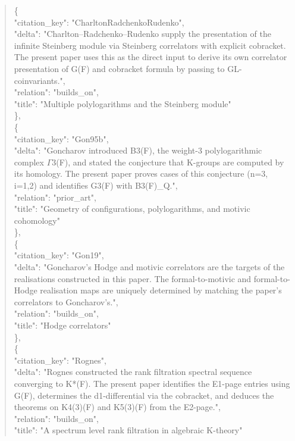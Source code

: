 \documentclass[11pt]{article}
\begin{document}
\begin{quote}
    \{\\
      "citation\_key": "CharltonRadchenkoRudenko",\\
      "delta": "Charlton--Radchenko--Rudenko supply the presentation of the infinite Steinberg module via Steinberg correlators with explicit cobracket. The present paper uses this as the direct input to derive its own correlator presentation of G(F) and cobracket formula by passing to GL-coinvariants.",\\
      "relation": "builds\_on",\\
      "title": "Multiple polylogarithms and the Steinberg module"\\
    \},\\
    \{\\
      "citation\_key": "Gon95b",\\
      "delta": "Goncharov introduced B3(F), the weight-3 polylogarithmic complex \ensuremath{\Gamma}3(F), and stated the conjecture that K-groups are computed by its homology. The present paper proves cases of this conjecture (n=3, i=1,2) and identifies G3(F) with B3(F)\_Q.",\\
      "relation": "prior\_art",\\
      "title": "Geometry of configurations, polylogarithms, and motivic cohomology"\\
    \},\\
    \{\\
      "citation\_key": "Gon19",\\
      "delta": "Goncharov's Hodge and motivic correlators are the targets of the realisations constructed in this paper. The formal-to-motivic and formal-to-Hodge realisation maps are uniquely determined by matching the paper's correlators to Goncharov's.",\\
      "relation": "builds\_on",\\
      "title": "Hodge correlators"\\
    \},\\
    \{\\
      "citation\_key": "Rognes",\\
      "delta": "Rognes constructed the rank filtration spectral sequence converging to K*(F). The present paper identifies the E1-page entries using G(F), determines the d1-differential via the cobracket, and deduces the theorems on K4(3)(F) and K5(3)(F) from the E2-page.",\\
      "relation": "builds\_on",\\
      "title": "A spectrum level rank filtration in algebraic K-theory"\\

\end{quote}
\end{document}

